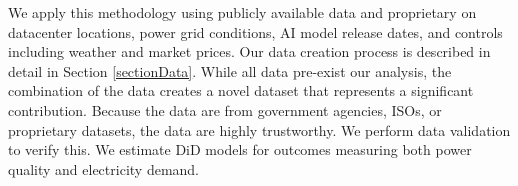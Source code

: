 \documentclass[sigconf,authordraft]{acmart}
\newcommand{\nb}[1]{\textcolor{blue}{NB[#1]}}
\begin{document}



We apply this methodology using publicly available data and proprietary on datacenter locations, power grid conditions, AI model release dates, and controls including weather and market prices. Our data creation process is described in detail in Section \ref{sectionData}. While all data pre-exist our analysis, the combination of the data creates a novel dataset that represents a significant contribution. Because the data are from government agencies, ISOs, or proprietary datasets, the data are highly trustworthy. We perform data validation to verify this. We estimate DiD models for outcomes measuring both power quality and electricity demand.
\end{document}
